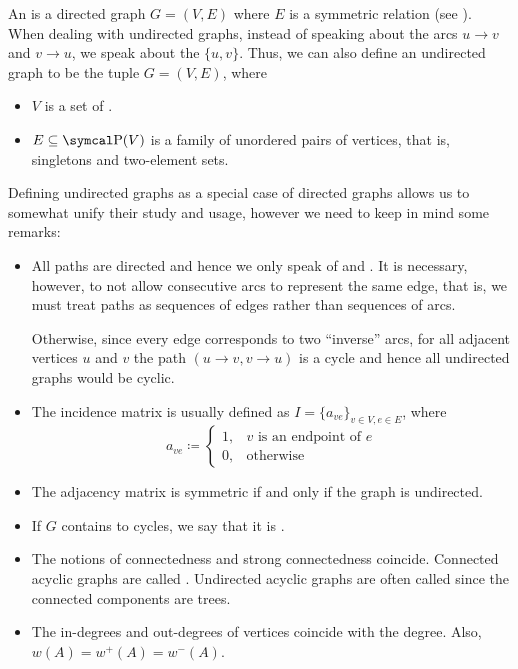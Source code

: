 \begin{definition}\label{def:undirected_graph}
  An  is a directed graph \( G = (V, E) \) where \( E \) is a symmetric relation (see ). When dealing with undirected graphs, instead of speaking about the arcs \( u \to v \) and \( v \to u \), we speak about the  \( \{ u, v \} \). Thus, we can also define an undirected graph to be the tuple \( G = (V, E) \), where
  \begin{itemize}
    \item \( V \) is a set of .
    \item \( E \subseteq \Power(V) \) is a family of unordered pairs of vertices, that is, singletons and two-element sets.
  \end{itemize}

  Defining undirected graphs as a special case of directed graphs allows us to somewhat unify their study and usage, however we need to keep in mind some remarks:
  \begin{itemize}
    \item All paths are directed and hence we only speak of  and . It is necessary, however, to not allow consecutive arcs to represent the same edge, that is, we must treat paths as sequences of edges rather than sequences of arcs.

    Otherwise, since every edge corresponds to two \enquote{inverse} arcs, for all adjacent vertices \( u \) and \( v \) the path \( (u \to v, v \to u) \) is a cycle and hence all undirected graphs would be cyclic.

    \item The incidence matrix is usually defined as \( I = \{ a_{ve} \}_{v \in V, e \in E} \), where
    \begin{equation*}
      a_{ve} \coloneqq \begin{cases}
        1, &v \text{ is an endpoint of } e \\
        0, &\text{otherwise}
      \end{cases}
    \end{equation*}

    \item The adjacency matrix is symmetric if and only if the graph is undirected.

    \item If \( G \) contains to cycles, we say that it is .

    \item The notions of connectedness and strong connectedness coincide. Connected acyclic graphs are called . Undirected acyclic graphs are often called  since the connected components are trees.

    \item The in-degrees and out-degrees of vertices coincide with the degree. Also, \( w(A) = w^+(A) = w^-(A) \).
  \end{itemize}
\end{definition}

